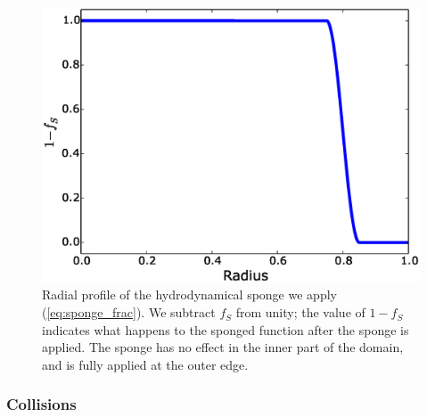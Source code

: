 \documentclass[12pt]{article}
\begin{document}
\begin{figure}
  \centering
  \includegraphics[scale=0.8]{plots/sponge}
  \caption[Radial profile of the hydrodynamical sponge]
          {Radial profile of the hydrodynamical sponge we apply (\autoref{eq:sponge_frac}).
           We subtract $f_S$ from unity; the value of $1 - f_S$ indicates what happens
           to the sponged function after the sponge is applied. The sponge has no effect
           in the inner part of the domain, and is fully applied at the outer edge.
           \label{fig:sponge}
          }
\end{figure}


\clearpage
\subsubsection{Collisions}
\label{sec:initial_state:collisions}
\end{document}
